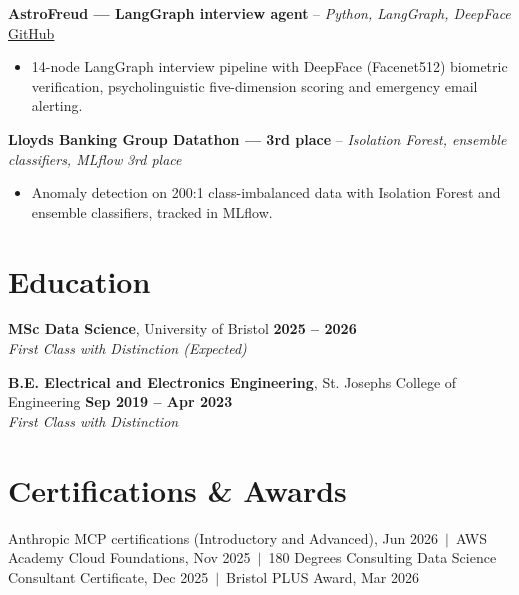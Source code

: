 \documentclass[a4paper,11pt]{article}
\begin{document}
\vspace{3pt}
\noindent\textbf{AstroFreud — LangGraph interview agent} -- \textit{Python, LangGraph, DeepFace} \hfill \href{https://github.com/Thiruvel-AP/AstroFreud}{GitHub}
\begin{itemize}
  \item 14-node LangGraph interview pipeline with DeepFace (Facenet512) biometric verification, psycholinguistic five-dimension scoring and emergency email alerting.
\end{itemize}
\vspace{3pt}
\noindent\textbf{Lloyd\textquotesingle{}s Banking Group Datathon — 3rd place} -- \textit{Isolation Forest, ensemble classifiers, MLflow} \hfill \textit{3rd place}
\begin{itemize}
  \item Anomaly detection on 200:1 class-imbalanced data with Isolation Forest and ensemble classifiers, tracked in MLflow.
\end{itemize}

\section{Education}
\textbf{MSc Data Science}, University of Bristol \hfill \textbf{2025 – 2026}\\ \textit{First Class with Distinction (Expected)}\par
\vspace{3pt}
\textbf{B.E. Electrical and Electronics Engineering}, St. Joseph\textquotesingle{}s College of Engineering \hfill \textbf{Sep 2019 – Apr 2023}\\ \textit{First Class with Distinction}\par

\section{Certifications \& Awards}
Anthropic MCP certifications (Introductory and Advanced), Jun 2026 \,$|$\, AWS Academy Cloud Foundations, Nov 2025 \,$|$\, 180 Degrees Consulting Data Science Consultant Certificate, Dec 2025 \,$|$\, Bristol PLUS Award, Mar 2026
\end{document}
